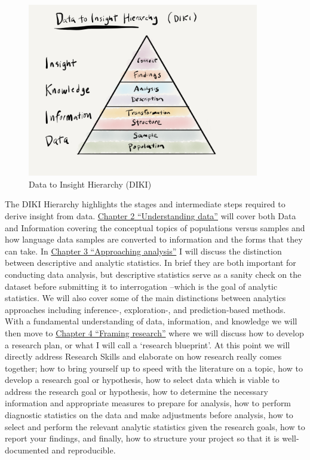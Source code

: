 \documentclass[
  letterpaper,
]{latex/krantz}
\begin{document}
\begin{figure}[h]

{\centering \includegraphics[width=0.9\textwidth,height=\textheight]{./figures/text-analysis/diki-hierarchy-paper.png}

}

\caption{\label{fig-diki-hierarchy}Data to Insight Hierarchy (DIKI)}

\end{figure}

The DIKI Hierarchy highlights the stages and intermediate steps required
to derive insight from data.
\protect\hyperlink{sec-understanding-data}{Chapter 2 ``Understanding
data''} will cover both Data and Information covering the conceptual
topics of populations versus samples and how language data samples are
converted to information and the forms that they can take. In
\protect\hyperlink{sec-approaching-analysis}{Chapter 3 ``Approaching
analysis''} I will discuss the distinction between descriptive and
analytic statistics. In brief they are both important for conducting
data analysis, but descriptive statistics serve as a sanity check on the
dataset before submitting it to interrogation --which is the goal of
analytic statistics. We will also cover some of the main distinctions
between analytics approaches including inference-, exploration-, and
prediction-based methods. With a fundamental understanding of data,
information, and knowledge we will then move to
\protect\hyperlink{framing-research-chapter}{Chapter 4 ``Framing
research''} where we will discuss how to develop a research plan, or
what I will call a `research blueprint'. At this point we will directly
address Research Skills and elaborate on how research really comes
together; how to bring yourself up to speed with the literature on a
topic, how to develop a research goal or hypothesis, how to select data
which is viable to address the research goal or hypothesis, how to
determine the necessary information and appropriate measures to prepare
for analysis, how to perform diagnostic statistics on the data and make
adjustments before analysis, how to select and perform the relevant
analytic statistics given the research goals, how to report your
findings, and finally, how to structure your project so that it is
well-documented and reproducible.
\end{document}
